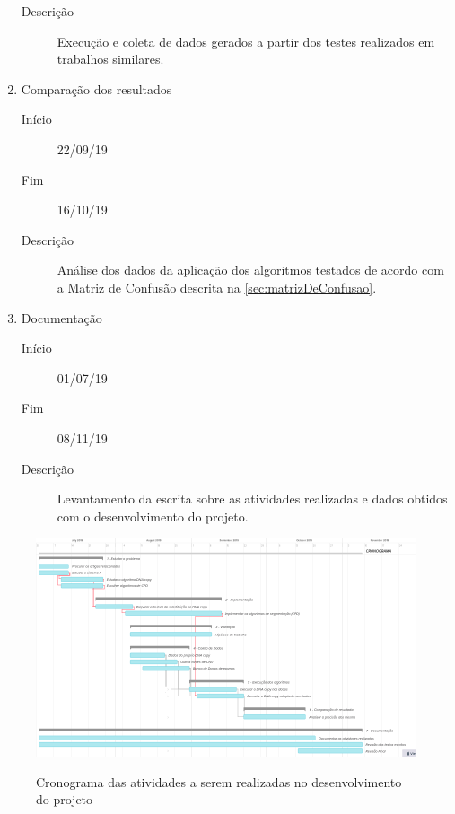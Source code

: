\begin{enumerate}
\begin{description}
        \item[Descrição] Execução e coleta de dados gerados a partir dos testes realizados em trabalhos similares.
    \end{description}
   \item Comparação dos resultados
   \begin{description}
        \item[Início] 22/09/19
        \item[Fim] 16/10/19
        \item[Descrição] Análise dos dados da aplicação dos algoritmos testados de acordo com a Matriz de Confusão descrita na \autoref{sec:matrizDeConfusao}.
    \end{description}
   \item Documentação
   \begin{description}
        \item[Início] 01/07/19
        \item[Fim] 08/11/19
        \item[Descrição] Levantamento da escrita sobre as atividades realizadas e dados obtidos com o desenvolvimento do projeto.
    \end{description}
 \end{enumerate}
 
\begin{landscape}
\begin{figure}[!htb]
    \centering
    \caption{Cronograma das atividades a serem realizadas no desenvolvimento do projeto}
    \includegraphics[width=1.5\textwidth]{./dados/figuras/cronograma}
    \label{fig:cronograma}
\end{figure}
\end{landscape}

